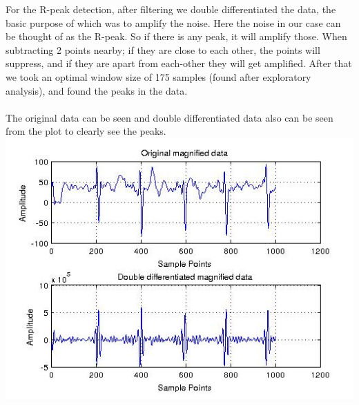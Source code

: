 \documentclass{article}
\begin{document}
For the R-peak detection, after filtering we double differentiated the data, the
basic purpose of which was to amplify the noise. Here the noise in our case can
be thought of as the R-peak. So if there is any peak, it will amplify those.
When subtracting 2 points nearby; if they are close to each other, the points
will suppress, and if they are apart from each-other they will get amplified.
After that we took an optimal window size of 175 samples (found after
exploratory analysis), and found the peaks in the data. \\ \\ 
The original data can be seen and double differentiated data also can be seen
from the plot to clearly see the peaks. \\
\includegraphics[width=\textwidth]{doublediff}
\end{document}
